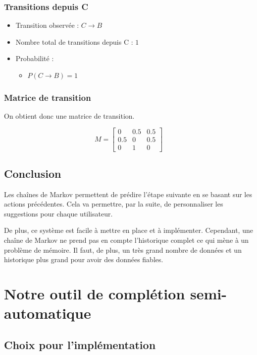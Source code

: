 \documentclass[a4paper, 11pt]{report}
\begin{document}
\subsection*{Transitions depuis C}
\begin{itemize}
	\item Transition observée : \( C \rightarrow B \)
	\item Nombre total de transitions depuis C : \(1\)
	\item Probabilité :
	      \begin{itemize}
		      \item \( P(C \rightarrow B) = 1 \)
	      \end{itemize}
\end{itemize}

\subsection*{Matrice de transition}
On obtient donc une matrice de transition.

\[
	M =
	\begin{bmatrix}
		0   & 0.5 & 0.5 \\
		0.5 & 0   & 0.5 \\
		0   & 1   & 0
	\end{bmatrix}
\]



\section{Conclusion}
Les chaînes de Markov permettent de prédire l'étape suivante en se basant sur les actions précédentes. Cela va permettre, par la suite, de personnaliser les suggestions pour chaque utilisateur. \par
De plus, ce système est facile à mettre en place et à implémenter. Cependant, une chaîne de Markov ne prend pas en compte l'historique complet ce qui mène à un problème de mémoire. Il faut, de plus, un très grand nombre de données et un historique plus grand pour avoir des données fiables.
\chapter{Notre outil de complétion semi-automatique}

\section{Choix pour l'implémentation}
\end{document}
